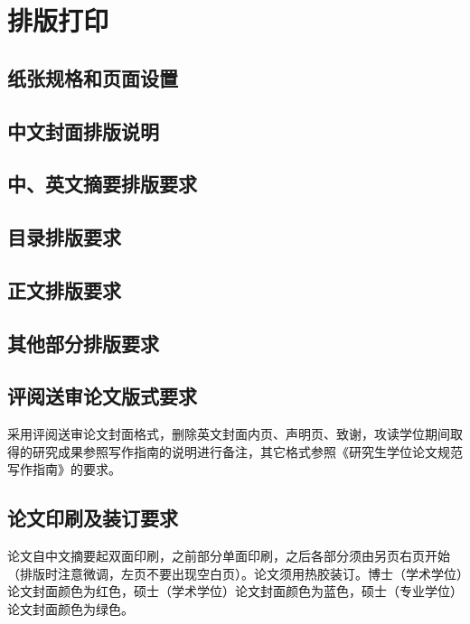 \chapter{排版打印}
\section{纸张规格和页面设置}
\section{中文封面排版说明}
\section{中、英文摘要排版要求}
\section{目录排版要求}
\section{正文排版要求}
\section{其他部分排版要求}
\section{评阅送审论文版式要求}
采用评阅送审论文封面格式，删除英文封面内页、声明页、致谢，攻读学位期间取得的研究成果参照写作指南的说明进行备注，其它格式参照《研究生学位论文规范写作指南》的要求。 
\section{论文印刷及装订要求}
论文自中文摘要起双面印刷，之前部分单面印刷，之后各部分须由另页右页开始（排版时注意微调，左页不要出现空白页）。论文须用热胶装订。博士（学术学位）论文封面颜色为红色，硕士（学术学位）论文封面颜色为蓝色，硕士（专业学位）论文封面颜色为绿色。